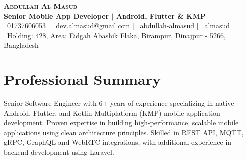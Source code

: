 \documentclass[letterpaper,11pt]{article}
\begin{document}
\begin{center}
    \textbf{\Huge \scshape Abdullah Al Masud} \\ \vspace{5pt}
    \small \textbf{Senior Mobile App Developer $|$ Android, Flutter \& KMP} \\ \vspace{5pt}
    \small \faPhone\ 01737606053 $|$
    \href{mailto:dev.almasud@gmail.com}{\faEnvelope\ dev.almasud@gmail.com} $|$
    \href{https://linkedin.com/in/abdullah-almasud}{\faLinkedin\ abdullah-almasud} $|$
    \href{https://github.com/almasud}{\faGithub\ almasud} \\
    \small \faMapMarker\ Holding: 428, Area: Eidgah Abashik Elaka, Birampur, Dinajpur - 5266, Bangladesh
\end{center}

\section{Professional Summary}
\small{Senior Software Engineer with 6+ years of experience specializing in native Android, Flutter, and Kotlin Multiplatform (KMP) mobile application development. Proven expertise in building high-performance, scalable mobile applications using clean architecture principles. Skilled in REST API, MQTT, gRPC, GraphQL and WebRTC integrations, with additional experience in backend development using Laravel.}

\end{document}
